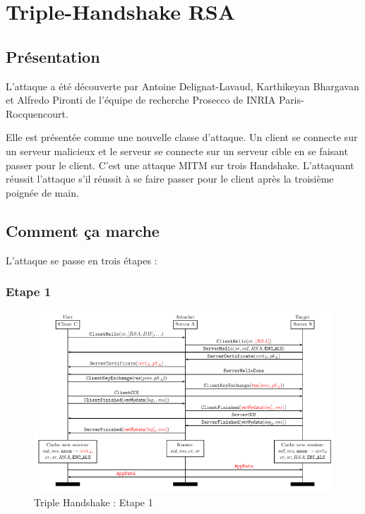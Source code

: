 \chapter{Triple-Handshake RSA}
\label{chapter:RSA}

\section{Présentation}
\label{sec:pTHR}

L'attaque a été découverte par Antoine Delignat-Lavaud, Karthikeyan Bhargavan et Alfredo Pironti 
de l'équipe de recherche Prosecco de INRIA Paris-Rocquencourt. 

Elle est présentée comme une nouvelle classe d'attaque. Un client se connecte sur un serveur malicieux et le serveur
se connecte sur un serveur cible en se faisant passer pour le client. C'est une attaque MITM sur trois Handshake.
L'attaquant réussit l'attaque s'il réussit à se faire passer pour le client après la troisième poignée de main.


\section{Comment ça marche}
\label{sec:ccmTHR}

L'attaque se passe en trois étapes :

\subsection{Etape 1}
\label{sec:e1}

\begin{figure}[h]
\label{fig:hand1}
\centering
\includegraphics[scale=0.4]{Hand1}
\caption{Triple Handshake : Etape 1}
\end{figure}

